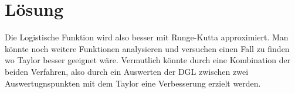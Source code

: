%
%
%
\section{Lösung
\label{taylor:section:loesung}}
Die Logistische Funktion wird also besser mit Runge-Kutta approximiert.
Man könnte noch weitere Funktionen analysieren und versuchen einen Fall zu finden wo Taylor besser geeignet wäre.
Vermutlich könnte durch eine Kombination der beiden Verfahren, also durch ein Auswerten der DGL zwischen zwei Auswertugnspunkten mit dem Taylor eine Verbesserung erzielt werden.



